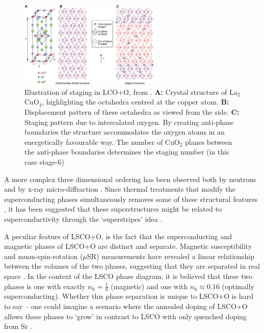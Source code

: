 \begin{figure}
    \centering
    \includegraphics[width=0.6\textwidth]{fig/intro/staging.png}
    \caption[staging]{Illustration of staging in LCO+O, from \cite{Wells1997}. \textbf{A:} Crystal structure of La$_2$CuO$_4$, highlighting the octahedra centred at the copper atom. \textbf{B:} Displacement pattern of these octahedra as viewed from the side. \textbf{C:} Staging pattern due to intercalated oxygen. By creating anti-phase boundaries the structure accommodates the oxygen atoms in an energetically favourable way. The number of CuO$_2$ planes between the anti-phase boundaries determines the staging number (in this case stage-6)}
    \label{fig:staging}
\end{figure}

A more complex three dimensional ordering has been observed both by neutrons \cite{Ray2017, Lee2004} and by x-ray micro-diffraction \cite{Fratini2010, Poccia2012}. Since thermal treatments that modify the superconducting phases simultaneously removes some of these structural features \cite{Poccia2012}, it has been suggested that these superstructures might be related to superconductivity through the `superstripes' idea \cite{Bianconi2000}.

A peculiar feature of LSCO+O, is the fact that the superconducting and magnetic phases of LSCO+O are distinct and separate. Magnetic susceptibility and muon-spin-rotation ($\mu$SR) measurements have revealed a linear relationship between the volumes of the two phases, suggesting that they are separated in real space \cite{Mohottala2006,Udby2013}. In the context of the LSCO phase diagram, it is believed that these two phases is one with exactly $n_\text{h} = \frac{1}{8}$ (magnetic) and one with $n_\text{h} \approx 0.16$ (optimally superconducting). Whether this phase separation is unique to LSCO+O is hard to say -- one could imagine a scenario where the annealed doping of LSCO+O allows these phases to `grow' in contrast to LSCO with only quenched doping from Sr \cite{Udby2013}.

